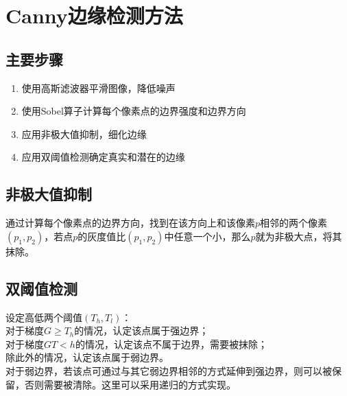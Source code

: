 \documentclass[UTF8]{ctexart}
\begin{document}
\section{Canny边缘检测方法}
\subsection{主要步骤}
\begin{enumerate}[itemsep=0pt, parsep=0pt,label=(\arabic*)]
\item{使用高斯滤波器平滑图像，降低噪声}
\item{使用Sobel算子计算每个像素点的边界强度和边界方向}
\item{应用非极大值抑制，细化边缘}
\item{应用双阈值检测确定真实和潜在的边缘}
\end{enumerate}

\subsection{非极大值抑制}
通过计算每个像素点的边界方向，找到在该方向上和该像素$p$相邻的两个像素$(p_1,p_2)$，若点$p$的灰度值比$(p_1,p_2)$中任意一个小，那么$p$就为非极大点，将其抹除。

\subsection{双阈值检测}
设定高低两个阈值$(T_h,T_l)$：\\
对于梯度$G\ge T_h$的情况，认定该点属于强边界；\\
对于梯度$GT<h$的情况，认定该点不属于边界，需要被抹除；\\
除此外的情况，认定该点属于弱边界。\\

对于弱边界，若该点可通过与其它弱边界相邻的方式延伸到强边界，则可以被保留，否则需要被清除。这里可以采用递归的方式实现。
\end{document}
